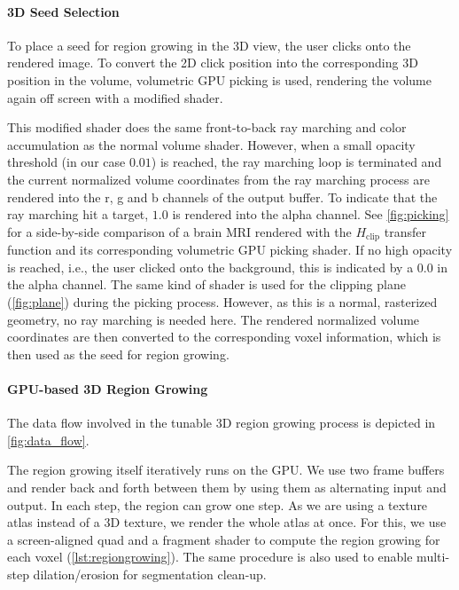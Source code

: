 \documentclass[sigconf]{acmart}
\begin{document}
\paragraph{3D Seed Selection}
To place a seed for region growing in the 3D view, the user clicks onto the rendered image.
To convert the 2D click position into the corresponding 3D position in the volume, volumetric GPU picking is used, rendering the volume again off screen with a modified shader.

This modified shader does the same front-to-back ray marching and color accumulation as the normal volume shader.
However, when a small opacity threshold (in our case $0.01$) is reached, the ray marching loop is terminated and the current normalized volume coordinates from the ray marching process are rendered into the r, g and b channels of the output buffer.
To indicate that the ray marching hit a target, $1.0$ is rendered into the alpha channel.
See \cref{fig:picking} for a side-by-side comparison of a brain MRI rendered with the $H_\textrm{clip}$ transfer function and its corresponding volumetric GPU picking shader.
If no high opacity is reached, i.e., the user clicked onto the background, this is indicated by a $0.0$ in the alpha channel.
The same kind of shader is used for the clipping plane (\cref{fig:plane}) during the picking process. 
However, as this is a normal, rasterized geometry, no ray marching is needed here. 
The rendered normalized volume coordinates are then converted to the corresponding voxel information, which is then used as the seed for region growing.



\paragraph{GPU-based 3D Region Growing}
The data flow involved in the tunable 3D region growing process is depicted in \cref{fig:data_flow}.

The region growing itself iteratively runs on the GPU. 
We use two frame buffers and render back and forth between them by using them as alternating input and output.
In each step, the region can grow one step. 
As we are using a texture atlas instead of a 3D texture, we render the whole atlas at once.
For this, we use a screen-aligned quad and a fragment shader to compute the region growing for each voxel (\cref{lst:regiongrowing}). The same procedure is also used to enable multi-step dilation/erosion for segmentation clean-up.
\end{document}
